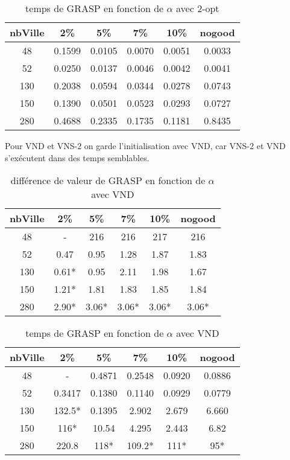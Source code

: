 \documentclass[12pt,a4paper]{article}
\begin{document}
\begin{table}[!h]
\centering
\begin{tabular}{|*{6}{c|}}
  \hline
  nbVille & 2\% & 5\% & 7\% & 10\% & nogood \\
  \hline
  48 & 0.1599 & 0.0105 & 0.0070 & 0.0051 & 0.0033 \\ 
  52 & 0.0250 & 0.0137 & 0.0046 & 0.0042 & 0.0041 \\
  130 & 0.2038 & 0.0594 & 0.0344 & 0.0278 & 0.0743 \\
  150 & 0.1390 & 0.0501 & 0.0523 & 0.0293 & 0.0727 \\  
  280 & 0.4688 & 0.2335 & 0.1735 & 0.1181 & 0.8435 \\
  \hline
\end{tabular}
\caption{temps de GRASP en fonction de $\alpha$ avec 2-opt}
\label{recherchelocaleGRASPtemps2optproba}
\end{table}

Pour VND et VNS-2 on garde l'initialisation avec VND, car VNS-2 et VND s’exécutent dans des temps semblables.

\begin{table}[!h]
\centering
\begin{tabular}{|*{6}{c|}}
  \hline
  nbVille & 2\% & 5\% & 7\% & 10\% & nogood \\
  \hline
  48 & - & 216 & 216 & 217 & 216 \\
  52 & 0.47 & 0.95 & 1.28 & 1.87 & 1.83 \\
  130 & 0.61* & 0.95 & 2.11 & 1.98 & 1.67 \\
  150 & 1.21* & 1.81 & 1.83 & 1.85 & 1.84 \\
  280 & 2.90* & 3.06* & 3.06* & 3.06* & 3.06* \\
  \hline
\end{tabular}
\caption{différence de valeur de GRASP en fonction de $\alpha$ avec VND}
\label{recherchelocaleGRASPtempsVNDproba}
\end{table}

\begin{table}[!h]
\centering
\begin{tabular}{|*{6}{c|}}
  \hline
  nbVille & 2\% & 5\% & 7\% & 10\% & nogood \\
  \hline
  48 & - & 0.4871 & 0.2548 & 0.0920 & 0.0886 \\
  52 & 0.3417 & 0.1380 & 0.1140 & 0.0929 & 0.0779 \\
  130 & 132.5* & 0.1395 & 2.902 & 2.679 & 6.660 \\
  150 & 116* & 10.54 & 4.295 & 2.443 & 6.82 \\
  280 & 220.8 & 118* & 109.2* & 111* & 95* \\
  \hline
\end{tabular}
\caption{temps de GRASP en fonction de $\alpha$ avec VND}
\label{recherchelocaleGRASPvalVNSproba}
\end{table}
\end{document}
